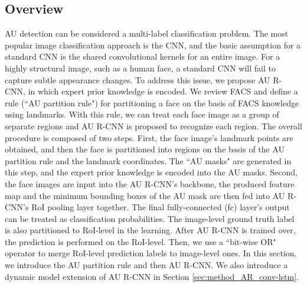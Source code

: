 \documentclass[5p,twocolumn]{elsarticle}
\begin{document}
\subsection{Overview}
AU detection can be considered a multi-label classification problem. The most popular image classification approach is the CNN, and the basic assumption for a standard CNN is the shared convolutional kernels for an entire image. For a highly structural image, such as a human face, a standard CNN will fail to capture subtle appearance changes. To address this issue, we propose AU R-CNN, in which expert prior knowledge is encoded. We review FACS \cite{ekman1977facial} and define a rule (``AU partition rule") for partitioning a face on the basis of FACS knowledge using landmarks. With this rule, we can treat each face image as a group of separate regions and AU R-CNN is proposed to recognize each region. The overall procedure is composed of two steps. First, the face image's landmark points are obtained, and then the face is partitioned into regions on the basis of the AU partition rule and the landmark coordinates. The ``AU masks" are generated in this step, and the expert prior knowledge is encoded into the AU masks. Second, the face images are input into the AU R-CNN's backbone, the produced feature map and the minimum bounding boxes of the AU mask are then fed into AU R-CNN's RoI pooling layer together. The final fully-connected (fc) layer's output can be treated as classification probabilities. The image-level ground truth label is also partitioned to RoI-level in the learning. After AU R-CNN is trained over, the prediction is performed on the RoI-level. Then, we use a ``bit-wise OR" operator to merge RoI-level prediction labels to image-level ones. 
In this section, we introduce the AU partition rule and then AU R-CNN. We also introduce a dynamic model extension of AU R-CNN in Section \ref{sec:method_AR_conv-lstm}.
\end{document}
